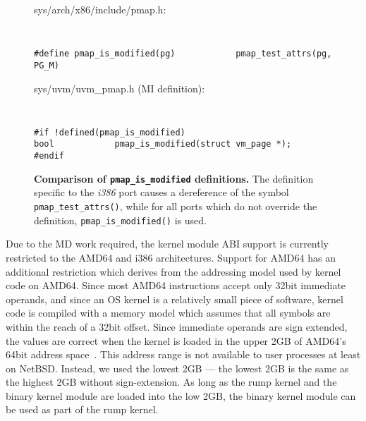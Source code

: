 \begin{figure}[t]
\begin{flushleft}
sys/arch/x86/include/pmap.h:
{\tt \scriptsize  
\begin{verbatim}
#define pmap_is_modified(pg)            pmap_test_attrs(pg, PG_M)
\end{verbatim}}

sys/uvm/uvm\_pmap.h (MI definition):
{\tt \scriptsize  
\begin{verbatim}
#if !defined(pmap_is_modified)
bool            pmap_is_modified(struct vm_page *);
#endif
\end{verbatim}}
\end{flushleft}
\caption[Comparison of \texttt{pmap\_is\_modified} definitions]{
\textbf{Comparison of \texttt{pmap\_is\_modified} definitions.}
The definition specific to the \textit{i386} port causes a dereference of the
symbol \texttt{pmap\_test\_attrs()}, while for all ports which do not
override the definition, \texttt{pmap\_is\_modified()} is used.
}
\label{fig:pmapmacros}
\end{figure}

Due to the MD work required, the kernel module ABI support is
currently restricted to the AMD64 and i386 architectures.  Support
for AMD64 has an additional restriction which derives from the
addressing model used by kernel code on AMD64.  Since most AMD64
instructions accept only 32bit immediate operands, and since an OS
kernel is a relatively small piece of software, kernel code is
compiled with a memory model which assumes that all symbols are
within the reach of a 32bit offset.  Since immediate operands are
sign extended, the values are correct when the kernel is loaded in
the upper 2GB of AMD64's 64bit address space~\cite{amd64abi}.  This
address range is not available to user processes at least on NetBSD.
Instead, we used the lowest 2GB --- the lowest 2GB is the same as
the highest 2GB without sign-extension.  As long as the rump kernel
and the binary kernel module are loaded into the low 2GB, the binary
kernel module can be used as part of the rump kernel.

